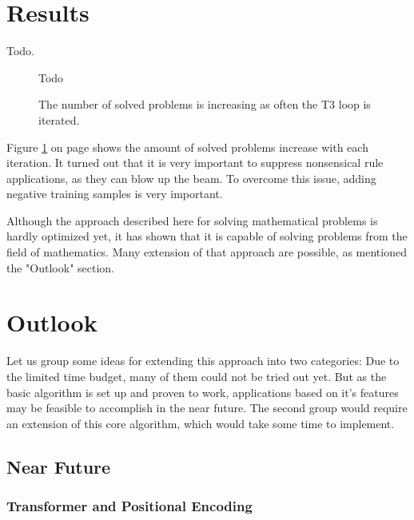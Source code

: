 \documentclass{scrartcl}
\theoremstyle{definition}
\begin{document}
\section{Results}

Todo.

\begin{figure}[!htbp]
	\centering
	Todo
	\caption{The number of solved problems is increasing as often the T3 loop is iterated.}
	\label{fig:t3loop_performance}
\end{figure}

Figure \ref{fig:t3loop_performance} on page \pageref{fig:t3loop_performance} shows the amount of solved problems increase with each iteration. 
It turned out that it is very important to suppress nonsensical rule applications, as they can blow up the beam.
To overcome this issue, adding negative training samples is very important.


Although the approach described here for solving mathematical problems is hardly optimized yet,
it has shown that it is capable of solving problems from the field of mathematics.
Many extension of that approach are possible, as mentioned the "Outlook" section.


\section{Outlook}

Let us group some ideas for extending this approach into two categories:
Due to the limited time budget, many of them could not be tried out yet.
But as the basic algorithm is set up and proven to work, applications based on it's features may be feasible to accomplish in the near future.
The second group would require an extension of this core algorithm, which would take some time to implement.

\subsection{Near Future}

\subsubsection{Transformer and Positional Encoding}
\end{document}
